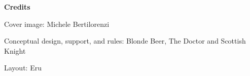 
\begin{center}
\textbf{Credits}

Cover image: Michele Bertilorenzi

Conceptual design, support, and rules: Blonde Beer, The Doctor and Scottish Knight

Layout: Eru
\end{center}
